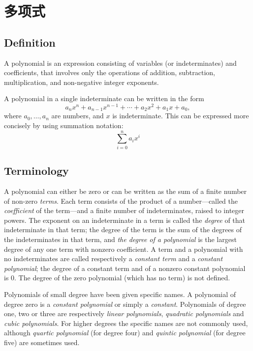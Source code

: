 \documentclass{book}
\numberwithin{equation}{section}
\numberwithin{figure}{section}
\theoremstyle{definition}
\begin{document}
\section{多项式}
\subsection{Definition}
A polynomial is an expression consisting of variables (or indeterminates) and coefficients, that involves only the operations of addition, subtraction, multiplication, and non-negative integer exponents.

A polynomial in a single indeterminate can be written in the form
\begin{equation*}
  a_n x^n + a_{n-1}x^{n-1} + \dotsb + a_2 x^2 + a_1 x + a_0,
\end{equation*}
where $a_0, \ldots, a_n$ are numbers, and $x$ is indeterminate.
This can be expressed more concisely by using summation notation:
\begin{equation*}
  \sum_{i=0}^n a_i x^i
\end{equation*}

\subsection{Terminology}
A polynomial can either be zero or can be written as the sum of a finite number of non-zero \emph{terms}. Each term consists of the product of a number---called the \emph{coefficient} of the term---and a finite number of indeterminates, raised to integer powers. The exponent on an indeterminate in a term is called the \emph{degree} of that indeterminate in that term; the degree of the term is the sum of the degrees of the indeterminates in that term, and \emph{the degree of a polynomial} is the largest degree of any one term with nonzero coefficient. A term and a polynomial with no indeterminates are called respectively a \emph{constant term} and a \emph{constant polynomial}; the degree of a constant term and of a nonzero constant polynomial is 0. The degree of the zero polynomial (which has no term) is not defined.

Polynomials of small degree have been given specific names. A polynomial of degree zero is a \emph{constant polynomial} or simply a \emph{constant}. Polynomials of degree one, two or three are respectively \emph{linear polynomials}, \emph{quadratic polynomials} and \emph{cubic polynomials}. For higher degrees the specific names are not commonly used, although \emph{quartic polynomial} (for degree four) and \emph{quintic polynomial} (for degree five) are sometimes used.
\end{document}
